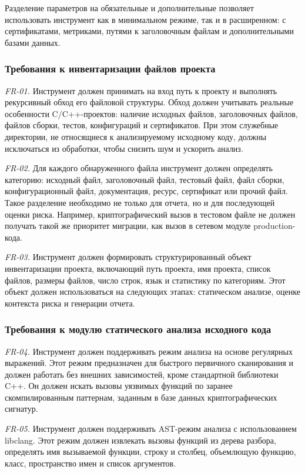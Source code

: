 \documentclass{itmo-vkr}
\begin{document}
	Разделение параметров на обязательные и дополнительные позволяет использовать инструмент как в минимальном режиме, так и в расширенном: с сертификатами, метриками, путями к заголовочным файлам и дополнительными базами данных.
	
	\subsubsection{Требования к инвентаризации файлов проекта}
	
	\textit{FR-01.} Инструмент должен принимать на вход путь к проекту и выполнять рекурсивный обход его файловой структуры. Обход должен учитывать реальные особенности C/C++-проектов: наличие исходных файлов, заголовочных файлов, файлов сборки, тестов, конфигураций и сертификатов. При этом служебные директории, не относящиеся к анализируемому исходному коду, должны исключаться из обработки, чтобы снизить шум и ускорить анализ.
	
	\textit{FR-02.} Для каждого обнаруженного файла инструмент должен определять категорию: исходный файл, заголовочный файл, тестовый файл, файл сборки, конфигурационный файл, документация, ресурс, сертификат или прочий файл. Такое разделение необходимо не только для отчета, но и для последующей оценки риска. Например, криптографический вызов в тестовом файле не должен получать такой же приоритет миграции, как вызов в сетевом модуле production-кода.
	
	\textit{FR-03.} Инструмент должен формировать структурированный объект инвентаризации проекта, включающий путь проекта, имя проекта, список файлов, размеры файлов, число строк, язык и статистику по категориям. Этот объект должен использоваться на следующих этапах: статическом анализе, оценке контекста риска и генерации отчета.
	
	
	\subsubsection{Требования к модулю статического анализа исходного кода}
	
	\textit{FR-04.} Инструмент должен поддерживать режим анализа на основе регулярных выражений. Этот режим предназначен для быстрого первичного сканирования и должен работать без внешних зависимостей, кроме стандартной библиотеки C++. Он должен искать вызовы уязвимых функций по заранее скомпилированным паттернам, заданным в базе данных криптографических сигнатур.
	
	\textit{FR-05.} Инструмент должен поддерживать AST-режим анализа с использованием libclang. Этот режим должен извлекать вызовы функций из дерева разбора, определять имя вызываемой функции, строку и столбец, объемлющую функцию, класс, пространство имен и список аргументов.
	
\end{document}
